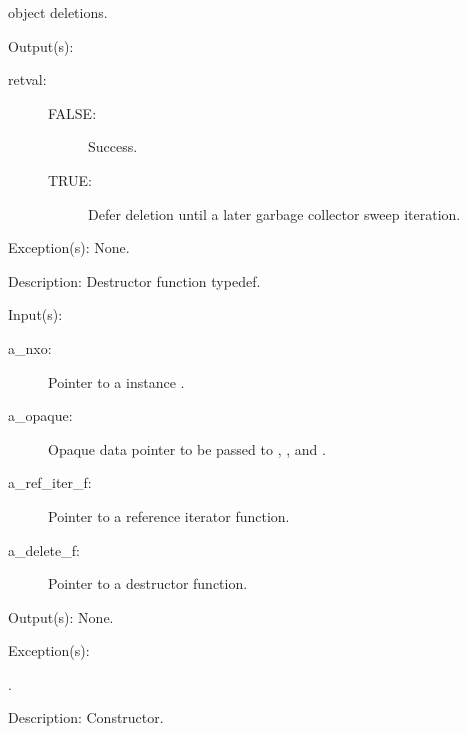 \begin{capi}
\begin{capilist}
\begin{description}
			object deletions.
		\end{description}
	\item[Output(s): ]
		\begin{description}\item[]
		\item[retval: ]
			\begin{description}\item[]
			\item[FALSE: ] Success.
			\item[TRUE: ] Defer deletion until a later garbage
			collector sweep iteration.
			\end{description}
		\end{description}
	\item[Exception(s): ] None.
	\item[Description: ]
		Destructor function typedef.
	\end{capilist}
\label{nxo_instance_new}
	\begin{capilist}
	\item[Input(s): ]
		\begin{description}\item[]
		\item[a\_nxo: ]
			Pointer to a instance .
		\item[a\_opaque: ]
			Opaque data pointer to be passed to ,
			, and .
		\item[a\_ref\_iter\_f: ]
			Pointer to a reference iterator function.
		\item[a\_delete\_f: ]
			Pointer to a destructor function.
		\end{description}
	\item[Output(s): ] None.
	\item[Exception(s): ]
		\begin{description}\item[]
		\item[.]
		\end{description}
	\item[Description: ]
		Constructor.
	\end{capilist}
\label{nxo_instance_isa_get}

\end{capi}
